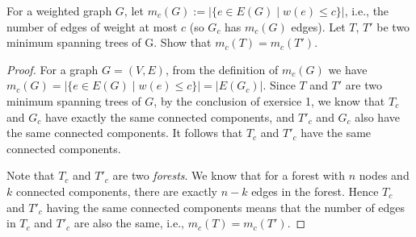 



    \begin{thm}{}{}
        For a weighted graph $G$, let $m_c(G) := | \{e \in E(G) \mid w(e) \leq c\}|$, i.e., the number of edges of weight at most $c$ (so $G_c$ has $m_c(G)$ edges). Let $T$, $T'$ be two minimum spanning trees of G. Show that $m_c(T) = m_c(T')$.
    \end{thm}

    \begin{proof}
        For a graph $G = (V, E)$, from the definition of $m_c(G)$ we have $m_c(G) = | \{e \in E(G) \mid w(e) \leq c\} | = |E(G_c)|$. Since $T$ and $T'$ are two minimum spanning trees of $G$, by the conclusion of exersice 1, we know that $T_c$ and $G_c$ have exactly the same connected components, and $T'_c$ and $G_c$ also have the same connected components. It follows that $T_c$ and $T'_c$ have the same connected components.
        
        Note that $T_c$ and $T'_c$ are two \textit{forests}. We know that for a forest with $n$ nodes and $k$ connected components, there are exactly $n - k$ edges in the forest. Hence $T_c$ and $T'_c$ having the same connected components means that the number of edges in $T_c$ and $T'_c$ are also the same, i.e., $m_c(T) = m_c(T')$.
    \end{proof}




